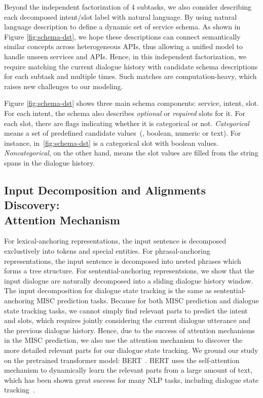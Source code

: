 Beyond the independent factorization of 4 subtasks, we also consider
describing each decomposed intent/slot label with natural
language. By using natural language description to define a dynamic
set of service schema. As shown in Figure \ref{fig:schema-dst}, we
hope these descriptions can connect semantically similar concepts
across heterogeneous APIs, thus allowing a unified model to handle
unseen services and APIs. Hence, in this independent factorization, we
require matching the current dialogue history with candidate schema
descriptions for each subtask and multiple times. Such matches are
computation-heavy, which raises new challenges to our modeling.

Figure \ref{fig:schema-dst} shows three
main schema components: service, intent, slot. For each intent, the
schema also describes {\it optional} or {\it required} slots for
it. For each slot, there are flags indicating whether it is
categorical or not. {\it Categorical} means a set of
predefined candidate values~(\ie, boolean, numeric or text). For instance,
 in~\autoref{fig:schema-dst} is a categorical
slot with boolean values. {\it Noncategorical}, on the other hand,
means the slot values are filled from the string spans in the dialogue
history.

\subsection[Input Decomposition and Alignments Discovery: Attention]{Input Decomposition and Alignments Discovery: \\Attention Mechanism}
\label{sec:sgd:decompose-x}
For lexical-anchoring representations, the input sentence is decomposed exclustively
into tokens and special entities. For phrasal-anchoring representations, the input
sentence is decomposed into nested phrases which forms a tree
structure. For sentential-anchoring representsions, we show that the input dialogue
are naturally decomposed into a sliding dialogue history window. The
input decomposition for dialogue state tracking is the same as
sentential-anchoring MISC prediction tasks. Because for both MISC
prediction and dialogue state tracking tasks, we cannot simply find
relevant parts to predict the intent and slots, which requires jointly
considering the current dialogue utterance and the previous dialogue
history. Hence, due to the success of attention mechanisms in the MISC
prediction, we also use the attention mechanism to discover the more
detailed relevant parts for our dialogue state tracking. We ground our
study on the pretrained transformer model:
BERT~\citep{devlin2019bert}. BERT uses the self-attention mechanism to
dynamically learn the relevant parts from a large amount of text,
which has been shown great success for many NLP tasks, including
dialogue state tracking~\citep{chao2019bert,noroozi2020fast}.

